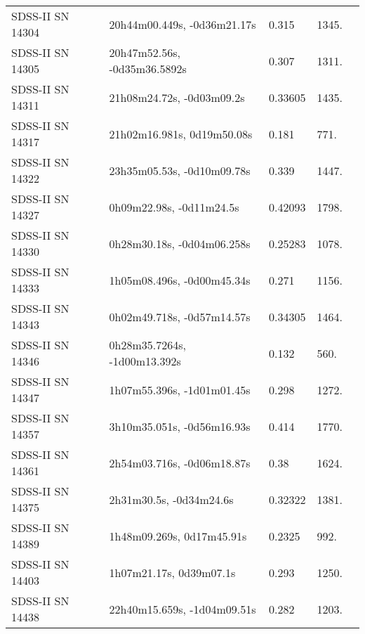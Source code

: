 \begin{longtable}{lllll}
 SDSS-II SN 14304 &    20h44m00.449s, -0d36m21.17s &    0.315 &          1345. &    \citet{2011ApJ...738..162S} \\
 SDSS-II SN 14305 &   20h47m52.56s, -0d35m36.5892s &    0.307 &          1311. &    \citet{2011ApJ...738..162S} \\
 SDSS-II SN 14311 &      21h08m24.72s, -0d03m09.2s &  0.33605 &          1435. &    \citet{2016SDSSD.C...0000:} \\
 SDSS-II SN 14317 &     21h02m16.981s, 0d19m50.08s &    0.181 &           771. &    \citet{2011ApJ...738..162S} \\
 SDSS-II SN 14322 &     23h35m05.53s, -0d10m09.78s &    0.339 &          1447. &    \citet{2011ApJ...738..162S} \\
 SDSS-II SN 14327 &       0h09m22.98s, -0d11m24.5s &  0.42093 &          1798. &    \citet{2016SDSSD.C...0000:} \\
 SDSS-II SN 14330 &     0h28m30.18s, -0d04m06.258s &  0.25283 &          1078. &    \citet{2016SDSSD.C...0000:} \\
 SDSS-II SN 14333 &     1h05m08.496s, -0d00m45.34s &    0.271 &          1156. &    \citet{2011ApJ...738..162S} \\
 SDSS-II SN 14343 &     0h02m49.718s, -0d57m14.57s &  0.34305 &          1464. &    \citet{2016SDSSD.C...0000:} \\
 SDSS-II SN 14346 &   0h28m35.7264s, -1d00m13.392s &    0.132 &           560. &    \citet{2011ApJ...738..162S} \\
 SDSS-II SN 14347 &     1h07m55.396s, -1d01m01.45s &    0.298 &          1272. &    \citet{2011ApJ...738..162S} \\
 SDSS-II SN 14357 &     3h10m35.051s, -0d56m16.93s &    0.414 &          1770. &    \citet{2010ApJ...713.1026D} \\
 SDSS-II SN 14361 &     2h54m03.716s, -0d06m18.87s &     0.38 &          1624. &    \citet{2011ApJ...738..162S} \\
 SDSS-II SN 14375 &        2h31m30.5s, -0d34m24.6s &  0.32322 &          1381. &    \citet{2016SDSSD.C...0000:} \\
 SDSS-II SN 14389 &      1h48m09.269s, 0d17m45.91s &   0.2325 &           992. &    \citet{2011ApJ...738..162S} \\
 SDSS-II SN 14403 &        1h07m21.17s, 0d39m07.1s &    0.293 &          1250. &    \citet{2010ApJ...713.1026D} \\
 SDSS-II SN 14438 &    22h40m15.659s, -1d04m09.51s &    0.282 &          1203. &    \citet{2010ApJ...713.1026D} \\

\end{longtable}
